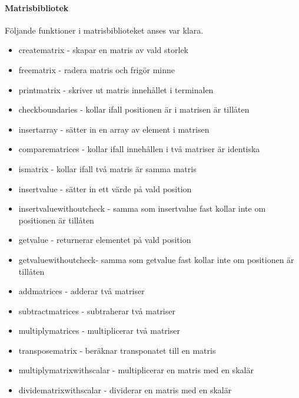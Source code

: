 \paragraph{Matrisbibliotek}
Följande funktioner i matrisbiblioteket anses var klara.
\begin{itemize}
\item{create\underline{\space}matrix - skapar en matris av vald storlek}
\item{free\underline{\space}matrix - radera matris och frigör minne}
\item{print\underline{\space}matrix - skriver ut matris innehållet i terminalen}
\item{check\underline{\space}boundaries - kollar ifall positionen är i matrisen är tillåten}
\item{insert\underline{\space}array - sätter in en array av element i matrisen}
\item{compare\underline{\space}matrices - kollar ifall innehållen i två matriser är identiska}
\item{is\underline{\space}matrix - kollar ifall två matris är samma matris}
\item{insert\underline{\space}value - sätter in ett värde på vald position}
\item{insert\underline{\space}value\underline{\space}without\underline{\space}check - samma som insert\underline{\space}value fast kollar inte om positionen är tillåten}
\item{get\underline{\space}value - returnerar elementet på vald position}
\item{get\underline{\space}value\underline{\space}without\underline{\space}check- samma som get\underline{\space}value fast kollar inte om positionen är tillåten}
\item{add\underline{\space}matrices - adderar två matriser}
\item{subtract\underline{\space}matrices - subtraherar två matriser}
\item{multiply\underline{\space}matrices - multiplicerar två matriser}
\item{transpose\underline{\space}matrix - beräknar transponatet till en matris}
\item{multiply\underline{\space}matrix\underline{\space}with\underline{\space}scalar - multiplicerar en matris med en skalär}
\item{divide\underline{\space}matrix\underline{\space}with\underline{\space}scalar - dividerar en matris med en skalär}
\end{itemize}

